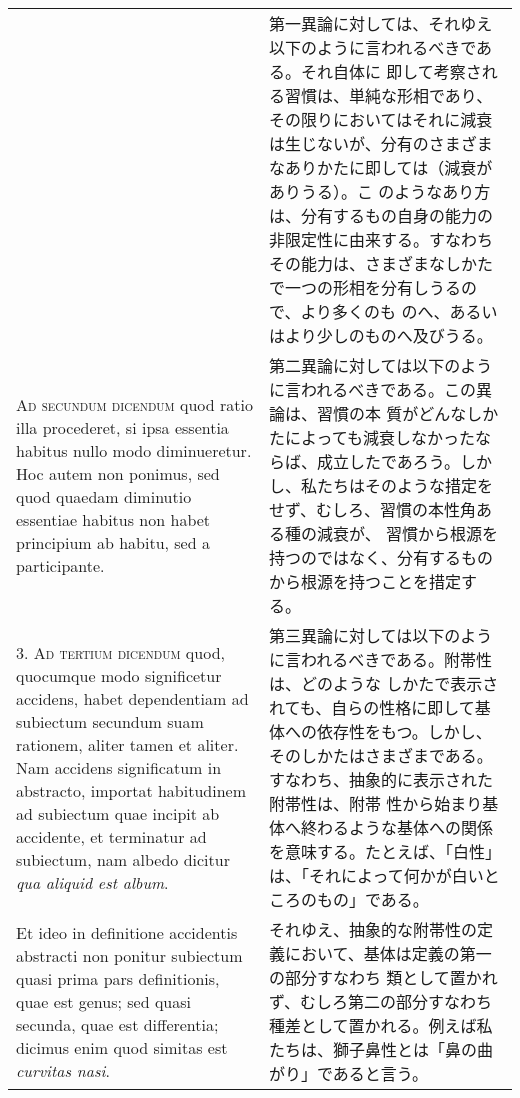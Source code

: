 \documentclass[10pt]{jsarticle} %
\begin{document}
\begin{longtable}{p{21em}p{21em}}
&

第一異論に対しては、それゆえ以下のように言われるべきである。それ自体に
即して考察される習慣は、単純な形相であり、その限りにおいてはそれに減衰
は生じないが、分有のさまざまなありかたに即しては（減衰がありうる）。こ
のようなあり方は、分有するもの自身の能力の非限定性に由来する。すなわち
その能力は、さまざまなしかたで一つの形相を分有しうるので、より多くのも
のへ、あるいはより少しのものへ及びうる。

\\



{\scshape Ad secundum dicendum} quod ratio illa procederet, si ipsa
essentia habitus nullo modo diminueretur. Hoc autem non ponimus, sed
quod quaedam diminutio essentiae habitus non habet principium ab
habitu, sed a participante.

&

第二異論に対しては以下のように言われるべきである。この異論は、習慣の本
質がどんなしかたによっても減衰しなかったならば、成立したであろう。しか
し、私たちはそのような措定をせず、むしろ、習慣の本性角ある種の減衰が、
習慣から根源を持つのではなく、分有するものから根源を持つことを措定する。

\\



3. {\scshape Ad tertium dicendum} quod, quocumque modo significetur
accidens, habet dependentiam ad subiectum secundum suam rationem,
aliter tamen et aliter. Nam accidens significatum in abstracto,
importat habitudinem ad subiectum quae incipit ab accidente, et
terminatur ad subiectum, nam albedo dicitur {\itshape qua aliquid est
album}.


&

第三異論に対しては以下のように言われるべきである。附帯性は、どのような
しかたで表示されても、自らの性格に即して基体への依存性をもつ。しかし、
そのしかたはさまざまである。すなわち、抽象的に表示された附帯性は、附帯
性から始まり基体へ終わるような基体への関係を意味する。たとえば、「白性」
は、「それによって何かが白いところのもの」である。


\\


Et ideo in definitione accidentis abstracti non ponitur subiectum
quasi prima pars definitionis, quae est genus; sed quasi secunda, quae
est differentia; dicimus enim quod simitas est {\itshape curvitas
nasi}.


&

それゆえ、抽象的な附帯性の定義において、基体は定義の第一の部分すなわち
類として置かれず、むしろ第二の部分すなわち種差として置かれる。例えば私
たちは、獅子鼻性とは「鼻の曲がり」であると言う。


\end{longtable}
\end{document}
